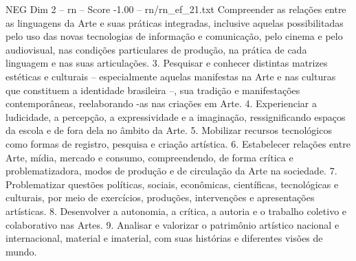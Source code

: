 \begin{textsample}{NEG Dim 2 – rn – Score -1.00 – rn/rn\_ef\_21.txt}
Compreender as relações entre as linguagens da Arte e suas práticas integradas, inclusive aquelas possibilitadas pelo uso das novas tecnologias de informação e comunicação, pelo cinema e pelo audiovisual, nas condições particulares de produção, na prática de cada linguagem e nas suas articulações. 3.
Pesquisar e conhecer distintas matrizes estéticas e culturais – especialmente aquelas manifestas na Arte e nas culturas que constituem a identidade brasileira –, sua tradição e manifestações contemporâneas, reelaborando -as nas criações em Arte. 4.
Experienciar a ludicidade, a percepção, a expressividade e a imaginação, ressignificando espaços da escola e de fora dela no âmbito da Arte. 5.
Mobilizar recursos tecnológicos como formas de registro, pesquisa e criação artística. 6.
Estabelecer relações entre Arte, mídia, mercado e consumo, compreendendo, de forma crítica e problematizadora, modos de produção e de circulação da Arte na sociedade. 7.
Problematizar questões políticas, sociais, econômicas, científicas, tecnológicas e culturais, por meio de exercícios, produções, intervenções e apresentações artísticas. 8.
Desenvolver a autonomia, a crítica, a autoria e o trabalho coletivo e colaborativo nas Artes. 9.
Analisar e valorizar o patrimônio artístico nacional e internacional, material e imaterial, com suas histórias e diferentes visões de mundo.

\end{textsample}
